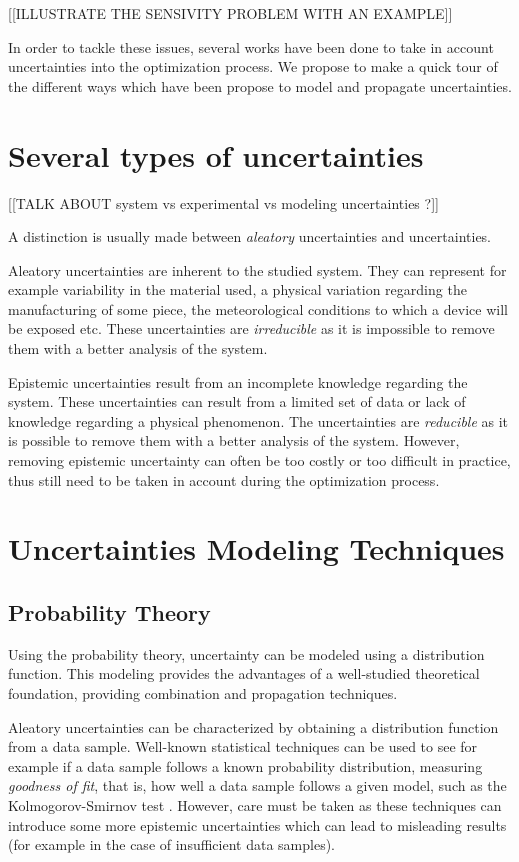 [[ILLUSTRATE THE SENSIVITY PROBLEM WITH AN EXAMPLE]]

In order to tackle these issues, several works have been done to take in account uncertainties into the optimization process. We propose to make a quick tour of the different ways which have been propose to model and propagate uncertainties.

\section{Several types of uncertainties}

[[TALK ABOUT system vs experimental vs modeling uncertainties ?]]

A distinction is usually made between \emph{aleatory} uncertainties and  uncertainties.

Aleatory uncertainties are inherent to the studied system. They can represent for example variability in the material used, a physical variation regarding the manufacturing of some piece, the meteorological conditions to which a device will be exposed etc.
These uncertainties are \emph{irreducible} as it is impossible to remove them with a better analysis of the system.

Epistemic uncertainties result from an incomplete knowledge regarding the system. These uncertainties can result from a limited set of data or lack of knowledge regarding a physical phenomenon.
The uncertainties are \emph{reducible} as it is possible to remove them with a better analysis of the system. However, removing epistemic uncertainty can often be too costly or too difficult in practice, thus still need to be taken in account during the optimization process.

\section{Uncertainties Modeling Techniques}

\subsection{Probability Theory}

Using the probability theory, uncertainty can be modeled using a distribution function. This modeling provides the advantages of a well-studied theoretical foundation, providing combination and propagation techniques.

Aleatory uncertainties can be characterized by obtaining a distribution function from a data sample.
Well-known statistical techniques can be used to see for example if a data sample follows a known probability distribution, measuring \emph{goodness of fit}, that is, how well a data sample follows a given model, such as the Kolmogorov-Smirnov test \cite{Massey_1951}. 
However, care must be taken as these techniques can introduce some more epistemic uncertainties which can lead to misleading results (for example in the case of insufficient data samples).

